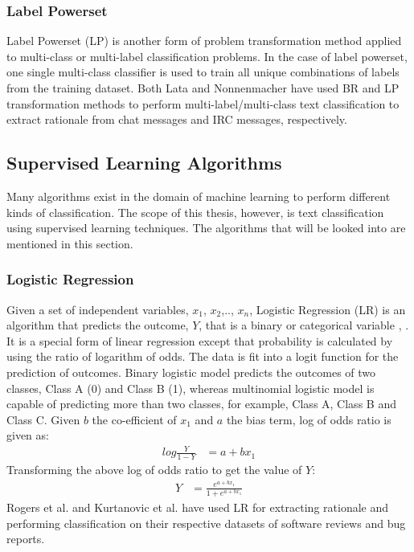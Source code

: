 \documentclass[a4paper,12pt,twoside]{report}
\begin{document}
\subsubsection{Label Powerset} 
Label Powerset (LP) is another form of problem transformation method applied to multi-class or multi-label classification problems. In the case of label powerset, one single multi-class classifier is used to train all unique combinations of labels from the training dataset.
\newline \newline
Both Lata \cite{Lata2016} and Nonnenmacher\cite{Nonnenmacher2017} have used BR and LP transformation methods to perform multi-label/multi-class text classification to extract rationale from chat messages and IRC messages, respectively. 

\subsection{Supervised Learning Algorithms}
Many algorithms exist in the domain of machine learning to perform different kinds of classification. The scope of this thesis, however, is text classification using supervised learning techniques. The algorithms that will be looked into are mentioned in this section.

\subsubsection{Logistic Regression}
Given a set of independent variables, $x_1$, $x_2$,.., $x_n$, Logistic Regression (LR) is an algorithm that predicts the outcome, $Y$, that is a binary or categorical variable \cite{Peng2002}, \cite{Strombergsson2009} . It is a special form of linear regression except that probability is calculated by using the ratio of logarithm of odds. The data is fit into a logit function for the prediction of outcomes. Binary logistic model predicts the outcomes of two classes, Class A (0) and Class B (1), whereas multinomial logistic model is capable of predicting more than two classes, for example, Class A, Class B and Class C\cite{Jurafsky2017}. 
\newline \newline
Given $b$ the co-efficient of $x_1$ and $a$ the bias term, log of odds ratio is given as:
\begin{align*}
log\frac{Y}{1-Y} &= a + bx_1
\end{align*}
\newline \newline
Transforming the above log of odds ratio to get the value of $Y$:
\begin{align*}
Y &=  \frac{e^{a + bx_1}}{1 + e^{a + bx_1}}
\end{align*}
\newline \newline
Rogers et al.\cite{Rogers2012} and Kurtanovic et al.\cite{Kurtanovic2017} have used LR for extracting rationale and performing classification on their respective datasets of software reviews and bug reports. 
\end{document}
